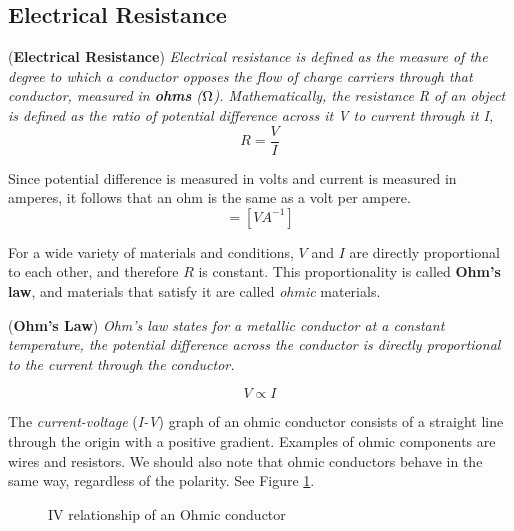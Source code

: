 \subsection{Electrical Resistance}

\begin{definition}{(\textbf{Electrical Resistance})}
\textit{Electrical resistance is defined as the measure of the degree to which a conductor opposes the flow of charge carriers through that conductor,
measured in \textbf{ohms} ($\ohm$). Mathematically, the resistance R of an object is defined as the ratio of potential difference across it V to current through it I,}
\begin{equation}
    R = \frac{V}{I}
\end{equation}
\end{definition}

Since potential difference is measured in volts and current is measured in amperes, it follows that an ohm is the same as a volt per ampere.
\begin{equation*}
    [\ohm] = [VA^{-1}]
\end{equation*}

For a wide variety of materials and conditions, $V$ and $I$ are directly proportional to each other, and therefore $R$ is constant. This proportionality is called \textbf{Ohm's law}, and materials that satisfy it are called \textit{ohmic} materials.

\begin{theorem}{(\textbf{Ohm's Law})}
\textit{Ohm's law states for a metallic conductor at a constant temperature, the potential difference across the conductor is directly proportional to the current through the conductor.}

\begin{equation}
    V \propto I
\end{equation}
\end{theorem}

The \textit{current-voltage} (\textit{I-V}) graph of an ohmic conductor consists of a straight line through the origin with a positive gradient. Examples of ohmic components are wires and resistors. We should also note that ohmic conductors behave in the same way, regardless of the polarity. See Figure \ref{fig:IV-Ohmic}.

\begin{figure}[h!]
    \centering
    \caption{IV relationship of an Ohmic conductor}
    \label{fig:IV-Ohmic}
\end{figure}
\FloatBarrier


